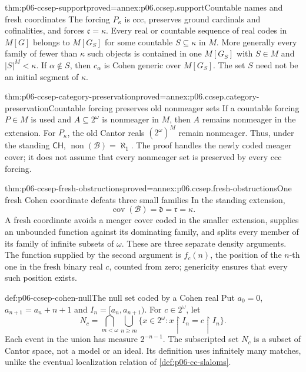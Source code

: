 \begin{hblemma}{thm:p06-ccsep-support}{proved=annex:p06.ccsep.support}{Countable names and fresh coordinates}
The forcing \(P_\kappa\) is ccc, preserves ground cardinals and
cofinalities, and forces \(\mathfrak c=\kappa\).
Every real or countable sequence of real codes in \(M[G]\) belongs
to \(M[G_S]\) for some countable \(S\subseteq\kappa\) in \(M\).
More generally every family of fewer than \(\kappa\) such objects
is contained in one \(M[G_S]\) with \(S\in M\) and
\(|S|^M<\kappa\). If \(\alpha\notin S\), then
\(c_\alpha\) is Cohen generic over \(M[G_S]\).
The set \(S\) need not be an initial segment of \(\kappa\).
\end{hblemma}

\begin{hblemma}{thm:p06-ccsep-category-preservation}{proved=annex:p06.ccsep.category-preservation}{Countable forcing preserves old nonmeager sets}
If a countable forcing \(P\in M\) is used and \(A\subseteq2^\omega\)
is nonmeager in \(M\), then \(A\) remains nonmeager in the extension.
For \(P_\kappa\), the old Cantor reals \((2^\omega)^M\) remain
nonmeager. Thus, under the standing \(\mathsf{CH}\),
\(\operatorname{non}(\mathcal B)=\aleph_1\).
The proof handles the newly coded meager cover; it does not assume
that every nonmeager set is preserved by every ccc forcing.
\end{hblemma}

\begin{hblemma}{thm:p06-ccsep-fresh-obstructions}{proved=annex:p06.ccsep.fresh-obstructions}{One fresh Cohen coordinate defeats three small families}
In the standing extension,
\[
 \operatorname{cov}(\mathcal B)=\mathfrak d=\mathfrak r=\kappa.
\]
A fresh coordinate avoids a meager cover coded in the smaller extension,
supplies an unbounded function against its dominating family, and splits
every member of its family of infinite subsets of \(\omega\).
These are three separate density arguments.
The function supplied by the second argument is \(f_c(n)\), the
position of the \(n\)-th one in the fresh binary real \(c\), counted
from zero; genericity ensures that every such position exists.
\end{hblemma}

\begin{hbdefinition}{def:p06-ccsep-cohen-null}{The null set coded by a Cohen real}
Put \(a_0=0\), \(a_{n+1}=a_n+n+1\) and
\(I_n=[a_n,a_{n+1})\). For \(c\in2^\omega\), let
\[
 N_c=\bigcap_{m<\omega}\bigcup_{n\geq m}
             \{x\in2^\omega:x\mathbin{\upharpoonright}I_n
                          =c\mathbin{\upharpoonright}I_n\}.
\]
Each event in the union has measure \(2^{-n-1}\).
The subscripted set \(N_c\) is a subset of Cantor space, not a model
or an ideal. Its definition uses infinitely many matches, unlike the
eventual localization relation of \cref{def:p06-cc-slaloms}.
\end{hbdefinition}

